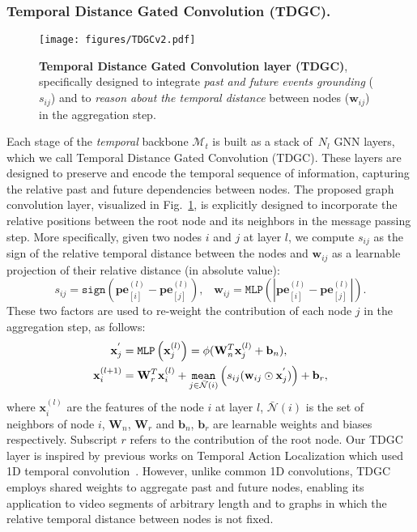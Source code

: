 \subsubsection{Temporal Distance Gated Convolution (TDGC).}
\begin{figure}[t]
    \centering
    \texttt{[image: figures/TDGCv2.pdf]}
    \caption{\textbf{Temporal Distance Gated Convolution layer (TDGC)}, specifically designed to integrate \emph{past and future events grounding} ($s_{ij}$) and to \emph{reason about the temporal distance} between nodes ($\mathbf{w}_{ij}$) in the aggregation step.}\label{fig:tdgc}
\end{figure}
Each stage of the \emph{temporal} backbone $\mathcal{M}_{t}$ is built as a stack of~$N_l$ GNN layers, which we call Temporal Distance Gated Convolution (TDGC).
These layers are designed to preserve and encode the temporal sequence of information, capturing the relative past and future dependencies between nodes. The proposed graph convolution layer, visualized in Fig.~\ref{fig:tdgc},
is explicitly designed to incorporate the relative positions between the root node and its neighbors in the message passing step.
More specifically, given two nodes $i$ and $j$ at layer $l$, we compute $s_{ij}$ as the sign of the relative temporal distance between the nodes and $\mathbf{w}_{ij}$ as a learnable projection of their relative distance (in absolute value):
\begin{equation}
    s_{ij} = \mathtt{sign}(\mathbf{pe}_{[i]}^{(l)} - \mathbf{pe}_{[j]}^{(l)}), \;\;\; \mathbf{w}_{ij} = \mathtt{MLP}(|\mathbf{pe}_{[i]}^{(l)} - \mathbf{pe}_{[j]}^{(l)}|).
\end{equation}
These two factors are used to re-weight the contribution of each node $j$ in the aggregation step, as follows:
\begin{align}
    \mathbf{x}_j^{'}     & = \mathtt{MLP}\left(\mathbf{x}_j^{(l)}\right) = \phi(\mathbf{W}_n^T \mathbf{x}_j^{(l)} + \mathbf{b}_n),                                                  \\
    \mathbf{x}_i^{(l+1)} & = \mathbf{W}^T_r\mathbf{x}_i^{(l)} + \operatorname*{\mathtt{mean}}_{j \in \bar{\mathcal{N}}(i)} \left( s_{ij} ( \mathbf{w}_{ij}  \odot \mathbf{x}_j^{'}) \right) + \mathbf{b}_r,
\end{align}
where $\mathbf{x}_i^{(l)}$ are the features of the node $i$ at layer $l$, $\bar{\mathcal{N}}(i)$ is the set of neighbors of node $i$, $\mathbf{W}_n$, $\mathbf{W}_r$ and $\mathbf{b}_n$, $\mathbf{b}_r$ are learnable weights and biases respectively. Subscript $r$ refers to the contribution of the root node.
Our TDGC layer is inspired by previous works on Temporal Action Localization which used 1D temporal convolution~\cite{zhao2021video,zhang2022actionformer}.
However, unlike common 1D convolutions, TDGC employs shared weights to aggregate past and future nodes,
enabling its application to video segments of arbitrary length and to graphs in which the relative temporal distance between nodes is not fixed.


